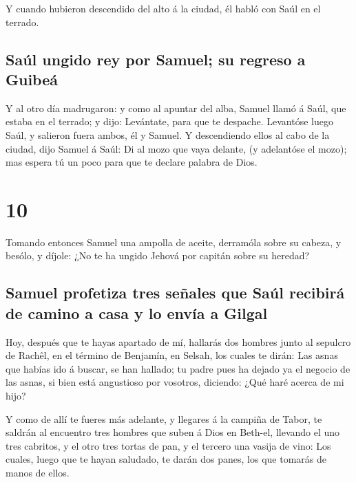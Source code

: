  Y cuando hubieron descendido del alto á la ciudad, él
habló con Saúl en el terrado.

\hypertarget{sauxfal-ungido-rey-por-samuel-su-regreso-a-guibeuxe1}{%
\subsection{Saúl ungido rey por Samuel; su regreso a
Guibeá}\label{sauxfal-ungido-rey-por-samuel-su-regreso-a-guibeuxe1}}

 Y al otro día madrugaron: y como al apuntar del alba,
Samuel llamó á Saúl, que estaba en el terrado; y dijo: Levántate, para
que te despache. Levantóse luego Saúl, y salieron fuera ambos, él y
Samuel.  Y descendiendo ellos al cabo de la ciudad, dijo
Samuel á Saúl: Di al mozo que vaya delante, (y adelantóse el mozo); mas
espera tú un poco para que te declare palabra de Dios.

\hypertarget{section-09-10}{%
\section{10}\label{section-09-10}}

 Tomando entonces Samuel una ampolla de aceite, derramóla
sobre su cabeza, y besólo, y díjole: ¿No te ha ungido Jehová por capitán
sobre su heredad?

\hypertarget{samuel-profetiza-tres-seuxf1ales-que-sauxfal-recibiruxe1-de-camino-a-casa-y-lo-envuxeda-a-gilgal}{%
\subsection{Samuel profetiza tres señales que Saúl recibirá de camino a
casa y lo envía a
Gilgal}\label{samuel-profetiza-tres-seuxf1ales-que-sauxfal-recibiruxe1-de-camino-a-casa-y-lo-envuxeda-a-gilgal}}

 Hoy, después que te hayas apartado de mí, hallarás dos
hombres junto al sepulcro de Rachêl, en el término de Benjamín, en
Selsah, los cuales te dirán: Las asnas que habías ido á buscar, se han
hallado; tu padre pues ha dejado ya el negocio de las asnas, si bien
está angustioso por vosotros, diciendo: ¿Qué haré acerca de mi hijo?

 Y como de allí te fueres más adelante, y llegares á la
campiña de Tabor, te saldrán al encuentro tres hombres que suben á Dios
en Beth-el, llevando el uno tres cabritos, y el otro tres tortas de pan,
y el tercero una vasija de vino:  Los cuales, luego que te
hayan saludado, te darán dos panes, los que tomarás de manos de ellos.

